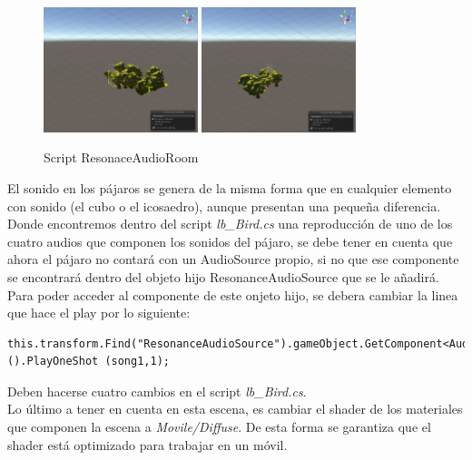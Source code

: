 \begin{figure}[htb]
	\centering
	\includegraphics[width=0.40\textwidth]{./imagenes/culling1}
	\includegraphics[width=0.40\textwidth]{./imagenes/culling2}
	\caption{Script ResonaceAudioRoom}
\end{figure}


\quad El sonido en los pájaros se genera de la misma forma que en cualquier elemento con sonido (el cubo o el icosaedro), aunque presentan una pequeña diferencia. Donde encontremos dentro del script \textit{lb\_Bird.cs} una reproducción de uno de los cuatro audios que componen los sonidos del pájaro, se debe tener en cuenta que ahora el pájaro no contará con un AudioSource propio, si no que ese componente se encontrará dentro del objeto hijo ResonanceAudioSource que se le añadirá.\\

\quad Para poder acceder al componente de este onjeto hijo, se debera cambiar la linea que hace el play por lo siguiente:\\

\lstset{language=[sharp]C, breaklines=true, basicstyle=\footnotesize}
\begin{lstlisting}[frame=single, caption={Ejemplo de cambio de audio para pájaro}]
	this.transform.Find("ResonanceAudioSource").gameObject.GetComponent<AudioSource>().PlayOneShot (song1,1);
\end{lstlisting}

\quad Deben hacerse cuatro cambios en el script \textit{lb\_Bird.cs}.\\

\quad Lo último a tener en cuenta en esta escena, es cambiar el shader de los materiales que componen la escena a \textit{Movile/Diffuse}. De esta forma se garantiza que el shader está optimizado para trabajar en un móvil.\\

\newpage



